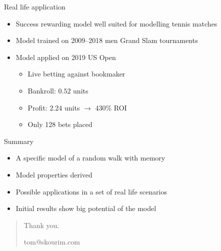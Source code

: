 \documentclass[american]{beamer}
\begin{document}
    \begin{frame}{Real life application}
        \begin{itemize}
            \item Success rewarding model well suited for modelling tennis matches
            \item Model trained on 2009--2018 men Grand Slam tournaments
            \item<2-> Model applied on 2019 US Open
            \begin{itemize}
                \item<3-> Live betting against bookmaker
                \item<4-> Bankroll: $0.52$ units
                \item<5-> Profit: $2.24$ units $\rightarrow$ $430\%$ ROI
                \item<6-> Only 128 bets placed
            \end{itemize}
        \end{itemize}
    \end{frame}

    \begin{frame}{Summary}
        \begin{itemize}
            \item A specific model of a random walk with memory
            \item Model properties derived
            \item Possible applications in a set of real life scenarios
            \item Initial results show big potential of the model
        \end{itemize}
    \end{frame}

    \begin{frame}[plain]
        \begin{quote}
            \begin{center}
                \huge{Thank you.}
            \end{center}
            \vspace{10mm}
            \begin{center}
                \large{tom@skourim.com}
            \end{center}
        \end{quote}
    \end{frame}
\end{document}
